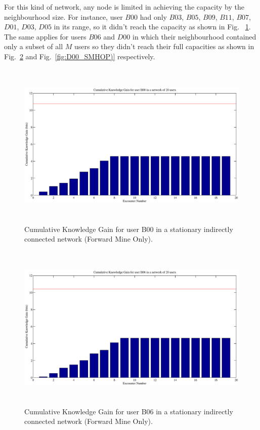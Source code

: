 \documentclass[11pt]{article}
\begin{document}
\begin{itemize}
For this kind of network, any node is limited in achieving the capacity by the neighbourhood size. For instance, user $B00$ had only $B03$, $B05$, $B09$, $B11$, $B07$, $D01$, $D03$, $D05$ in its range, so it didn't reach the capacity as shown in Fig. ~\ref{fig:B00_SMHOP)}.
The same applies for users $B06$ and $D00$ in which their neighbourhood contained only a subset of all $M$ users so they didn't reach their full capacities as shown in Fig.~\ref{fig:B06_SMHOP)} and Fig.~\ref{fig:D00_SMHOP)} respectively.
\begin{figure}[!bp]
\centering
 \includegraphics[width=15cm ,height=8cm]{figures_eps/B00_SMHOP}
    \caption{Cumulative Knowledge Gain for user B00 in a stationary indirectly connected network (Forward Mine Only).}\label{fig:B00_SMHOP)}
    \end{figure} 
    \begin{figure}[!bp]
	\centering
     \includegraphics[width=15cm ,height=8cm]{figures_eps/B06_SMHOP}
    \caption{Cumulative Knowledge Gain for user B06 in a stationary indirectly connected network (Forward Mine Only).}\label{fig:B06_SMHOP)}
    \end{figure}
    

\end{itemize}
\end{document}
